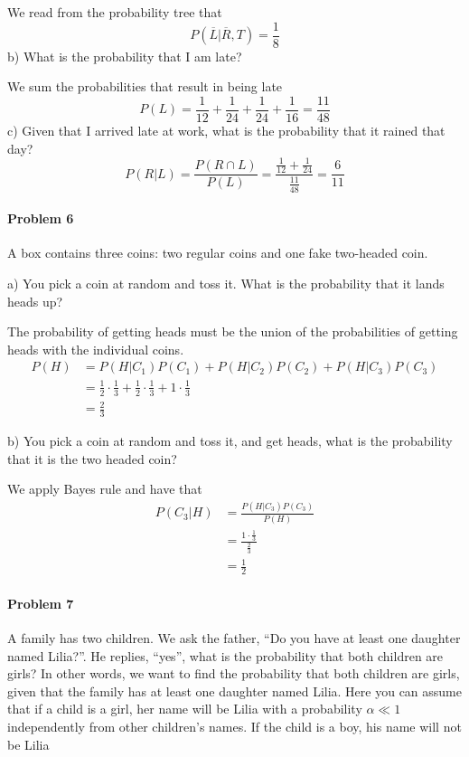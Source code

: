 We read from the probability tree that
\[
    P(\overline{L}|\overline{R},T)=\frac{1}{8}
\]
b) What is the probability that I am late?

We sum the probabilities that result in being late
\[
    P(L)=\frac{1}{12}+\frac{1}{24}+\frac{1}{24}+\frac{1}{16}=\frac{11}{48}
\]
c) Given that I arrived late at work, what is the probability that it rained that day?
\[
    P(R|L)=\frac{P(R\cap L)}{P(L)}=\frac{\frac{1}{12}+\frac{1}{24}}{\frac{11}{48}}=\frac{6}{11}
\]
\paragraph{Problem 6}
A box contains three coins: two regular coins and one fake two-headed coin.

a) You pick a coin at random and toss it. What is the probability that it lands heads up?

The probability of getting heads must be the union of the probabilities of getting heads with the individual coins.
\begin{align*}
    P(H)&=P(H|C_{1})P(C_{1})+P(H|C_{2})P(C_{2})+P(H|C_{3})P(C_{3}) \\
        &=\frac{1}{2} \cdot\frac{1}{3}+\frac{1}{2} \cdot\frac{1}{3}+1 \cdot\frac{1}{3} \\
        &=\frac{2}{3}
\end{align*}


b) You pick a coin at random and toss it, and get heads, what is the probability that it is the two headed coin?

We apply Bayes rule and have that
\begin{align*}
    P(C_{3}|H)&=\frac{P(H|C_{3})P(C_{3})}{P(H)} \\
           &=\frac{1\cdot\frac{1}{3}}{\frac{2}{3}} \\
           &=\frac{1}{2}
\end{align*}
\paragraph{Problem 7}
A family has two children. We ask the father, ``Do you have at least one daughter named Lilia?''. He replies, ``yes'', what is the probability that both children are girls? In other words, we want to find the probability that both children are girls, given that the family has at least one daughter named Lilia. Here you can assume that if a child is a girl, her name will be Lilia with a probability $\alpha\ll 1$ independently from other children's names. If the child is a boy, his name will not be Lilia

